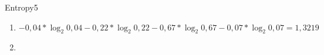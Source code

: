 \begin{questions}
	
	\begin{question}{Entropy}{5}		
	\begin{answer} 
			\begin{enumerate}
		\item \begin{equation}
 - 0,04 * {\log_2 0,04}  - 0,22 * {\log_2 0,22} - 0,67 * {\log_2 0,67} - 0,07 * {\log_2 0,07} = 1,3219   
\end{equation}
		\item 
		\end{enumerate}
		
	\end{answer}
		
	\end{question}
	
\end{questions}

